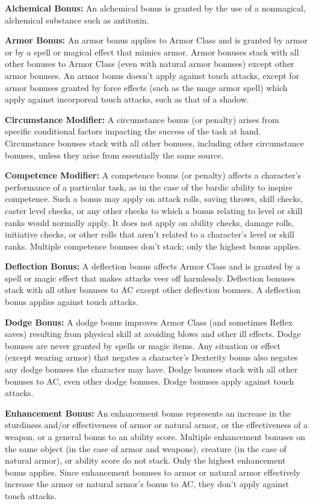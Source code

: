 \textbf{Alchemical Bonus:} An alchemical bonus is granted by the use of a nonmagical, alchemical substance such as antitoxin.

\textbf{Armor Bonus:} An armor bonus applies to Armor Class and is granted by armor or by a spell or magical effect that mimics armor. Armor bonuses stack with all other bonuses to Armor Class (even with natural armor bonuses) except other armor bonuses. An armor bonus doesn't apply against touch attacks, except for armor bonuses granted by force effects (such as the mage armor spell) which apply against incorporeal touch attacks, such as that of a shadow.

\textbf{Circumstance Modifier:} A circumstance bonus (or penalty) arises from specific conditional factors impacting the success of the task at hand. Circumstance bonuses stack with all other bonuses, including other circumstance bonuses, unless they arise from essentially the same source.

\textbf{Competence Modifier:} A competence bonus (or penalty) affects a character's performance of a particular task, as in the case of the bardic ability to inspire competence. Such a bonus may apply on attack rolls, saving throws, skill checks, caster level checks, or any other checks to which a bonus relating to level or skill ranks would normally apply. It does not apply on ability checks, damage rolls, initiative checks, or other rolls that aren't related to a character's level or skill ranks. Multiple competence bonuses don't stack; only the highest bonus applies.

\textbf{Deflection Bonus:} A deflection bonus affects Armor Class and is granted by a spell or magic effect that makes attacks veer off harmlessly. Deflection bonuses stack with all other bonuses to AC except other deflection bonuses. A deflection bonus applies against touch attacks.

\textbf{Dodge Bonus:} A dodge bonus improves Armor Class (and sometimes Reflex saves) resulting from physical skill at avoiding blows and other ill effects. Dodge bonuses are never granted by spells or magic items. Any situation or effect (except wearing armor) that negates a character's Dexterity bonus also negates any dodge bonuses the character may have. Dodge bonuses stack with all other bonuses to AC, even other dodge bonuses. Dodge bonuses apply against touch attacks.

\textbf{Enhancement Bonus:} An enhancement bonus represents an increase in the sturdiness and/or effectiveness of armor or natural armor, or the effectiveness of a weapon, or a general bonus to an ability score. Multiple enhancement bonuses on the same object (in the case of armor and weapons), creature (in the case of natural armor), or ability score do not stack. Only the highest enhancement bonus applies. Since enhancement bonuses to armor or natural armor effectively increase the armor or natural armor's bonus to AC, they don't apply against touch attacks.


